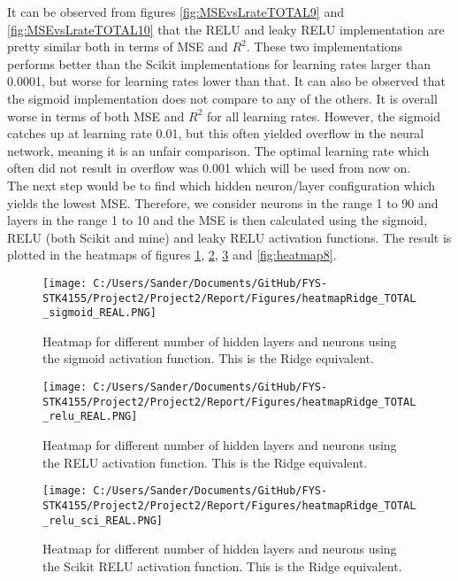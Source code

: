 \documentclass[12pt,a4paper]{article}
\begin{document}
\noindent It can be observed from figures \ref{fig:MSEvsLrateTOTAL9} and \ref{fig:MSEvsLrateTOTAL10} that the RELU and leaky RELU implementation are pretty similar both in terms of MSE and $R^2$. These two implementations performs better than the Scikit implementations for learning rates larger than 0.0001, but worse for learning rates lower than that. It can also be observed that the sigmoid implementation does not compare to any of the others. It is overall worse in terms of both MSE and $R^2$ for all learning rates. However, the sigmoid catches up at learning rate 0.01, but this often yielded overflow in the neural network, meaning it is an unfair comparison. The optimal learning rate which often did not result in overflow was 0.001 which will be used from now on.
\\
The next step would be to find which hidden neuron/layer configuration which yields the lowest MSE. Therefore, we consider neurons in the range 1 to 90 and layers in the range 1 to 10 and the MSE is then calculated using the sigmoid, RELU (both Scikit and mine) and leaky RELU activation functions. The result is plotted in the heatmaps of figures \ref{fig:heatmap5}, \ref{fig:heatmap6}, \ref{fig:heatmap7} and \ref{fig:heatmap8}.

\begin{figure}[H]
\centering
\texttt{[image: C:/Users/Sander/Documents/GitHub/FYS-STK4155/Project2/Project2/Report/Figures/heatmapRidge\_TOTAL\_sigmoid\_REAL.PNG]}
\caption{\label{fig:heatmap5} Heatmap for different number of hidden layers and neurons using the sigmoid activation function. This is the Ridge equivalent.}
\end{figure}

\begin{figure}[H]
\centering
\texttt{[image: C:/Users/Sander/Documents/GitHub/FYS-STK4155/Project2/Project2/Report/Figures/heatmapRidge\_TOTAL\_relu\_REAL.PNG]}
\caption{\label{fig:heatmap6} Heatmap for different number of hidden layers and neurons using the RELU activation function. This is the Ridge equivalent.}
\end{figure}

\begin{figure}[H]
\centering
\texttt{[image: C:/Users/Sander/Documents/GitHub/FYS-STK4155/Project2/Project2/Report/Figures/heatmapRidge\_TOTAL\_relu\_sci\_REAL.PNG]}
\caption{\label{fig:heatmap7} Heatmap for different number of hidden layers and neurons using the Scikit RELU activation function. This is the Ridge equivalent.}
\end{figure}
\end{document}
